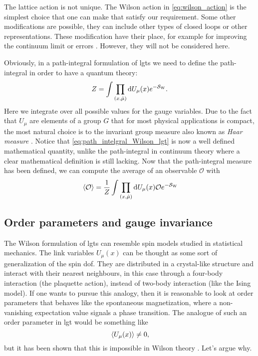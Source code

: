 The lattice action is not unique.
The Wilson action in \eqref{eq:wilson_action} is the simplest choice that one can make that satisfy our requirement.
Some other modifications are possible, they can include other types of closed loops or other representations.
These modification have their place, for example for improving the continuum limit or errors \cite{bhanot1982modified, edgar1982generalised, creutz1983generalized}.
However, they will not be considered here.

Obviously, in a path-integral formulation of \ac{lgt}s we need to define the path-integral in order to have a quantum theory:
\begin{equation}
    Z = \int \prod_{(x, \hat{\mu})}  \dd U_{\mu}(x) e^{- \mathcal{S}_{\text{W}}}.
    \label{eq:path_intelgral_Wilson_lgt}
\end{equation}
Here we integrate over all possible values for the gauge variables.
Due to the fact that $U_{\mu}$ are elements of a group $G$ that for most physical applications is compact, the most natural choice is to the invariant group measure also known as \emph{Haar measure} \cite[Chap.~8]{creutz1985book}.
Notice that \eqref{eq:path_intelgral_Wilson_lgt} is now a well defined mathematical quantity, unlike the path-integral in continuum theory where a clear mathematical definition is still lacking.
Now that the path-integral measure has been defined, we can compute the average of an observable $\mathcal{O}$ with
\begin{equation}
    \ev*{\mathcal{O}} = \frac{1}{Z} \int \prod_{(x, \hat{\mu})} \dd U_{\mu}(x) \mathcal{O} e^{- \Action_{\text{W}}}
\end{equation}


%
%
\subsection{Order parameters and gauge invariance}
\label{sub:order_parameters_and_gauge_invariance}

The Wilson formulation of \ac{lgt}s can resemble spin models studied in statistical mechanics.
The link variables $U_{\mu}(x)$ can be thought as some sort of generalization of the spin \ac{dof}.
They are distributed in a crystal-like structure and interact with their nearest neighbours, in this case through a four-body interaction (the plaquette action), instead of two-body interaction (like the Ising model).
If one wants to pursue this analogy, then it is reasonable to look at order parameters that behaves like the spontaneous magnetization, where a non-vanishing expectation value signals a phase transition.
The analogue of such an order parameter in \ac{lgt} would be something like
\begin{equation}
    \ev*{U_{\mu}(x)} \neq 0,
    \label{eq:non_zero_link_var_expt_value}
\end{equation}
but it has been shown that this is impossible in Wilson theory \cite{elitzur1975theorem}.
Let's argue why.

